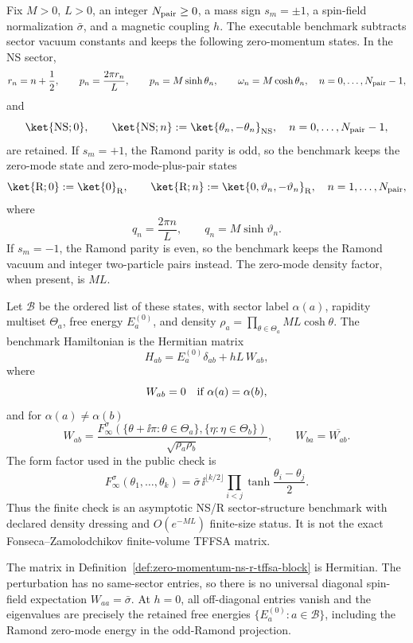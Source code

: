 \begin{definition}
\label{def:zero-momentum-ns-r-tffsa-block}
Fix \(M>0\), \(L>0\), an integer \(N_{\rm pair}\geq0\), a mass sign
\(s_m=\pm1\), a spin-field normalization \(\bar\sigma\), and a magnetic
coupling \(h\).  The executable benchmark subtracts sector vacuum constants
and keeps the following zero-momentum states.  In the NS sector,
\[
  r_n=n+\frac12,\qquad
  p_n=\frac{2\pi r_n}{L},\qquad
  p_n=M\sinh\theta_n,\qquad
  \omega_n=M\cosh\theta_n ,
  \quad n=0,\ldots,N_{\rm pair}-1,
\]
and
\[
  \ket{\mathrm{NS};0},\qquad
  \ket{\mathrm{NS};n}:=\ket{\theta_n,-\theta_n}_{\mathrm{NS}},\quad
  n=0,\ldots,N_{\rm pair}-1,
\]
are retained.  If \(s_m=+1\), the Ramond parity is odd, so the benchmark keeps
the zero-mode state and zero-mode-plus-pair states
\[
  \ket{\mathrm R;0}:=\ket{0}_{\mathrm R},\qquad
  \ket{\mathrm R;n}:=\ket{0,\vartheta_n,-\vartheta_n}_{\mathrm R},
  \quad n=1,\ldots,N_{\rm pair},
\]
where
\[
  q_n=\frac{2\pi n}{L},\qquad q_n=M\sinh\vartheta_n .
\]
If \(s_m=-1\), the Ramond parity is even, so the benchmark keeps the Ramond
vacuum and integer two-particle pairs instead.  The zero-mode density factor,
when present, is \(ML\).

Let \(\mathcal B\) be the ordered list of these states, with sector label
\(\alpha(a)\), rapidity multiset \(\Theta_a\), free energy \(E_a^{(0)}\),
and density \(\rho_a=\prod_{\theta\in\Theta_a}ML\cosh\theta\).  The benchmark
Hamiltonian is the Hermitian matrix
\[
  H_{ab}=E_a^{(0)}\delta_{ab}+hL\,W_{ab},
\]
where
\[
  W_{ab}=0\quad\hbox{if }\alpha(a)=\alpha(b),
\]
and for \(\alpha(a)\ne\alpha(b)\)
\begin{equation}
  W_{ab}
  =
  \frac{
    F_\infty^\sigma(
      \{\theta+\ii\pi:\theta\in\Theta_a\},
      \{\eta:\eta\in\Theta_b\})
  }{
    \sqrt{\rho_a\rho_b}
  },
  \qquad
  W_{ba}=\overline{W_{ab}} .
  \label{eq:zero-momentum-ns-r-tffsa-block}
\end{equation}
The form factor used in the public check is
\[
  F_\infty^\sigma(\theta_1,\ldots,\theta_k)
  =
  \bar\sigma\,\ii^{\lfloor k/2\rfloor}
  \prod_{i<j}\tanh\frac{\theta_i-\theta_j}{2}.
\]
Thus the finite check is an asymptotic NS/R sector-structure benchmark with
declared density dressing and \(O(e^{-ML})\) finite-size status.  It is not the
exact Fonseca--Zamolodchikov finite-volume TFFSA matrix.
\end{definition}

\begin{remark}
\label{rem:zero-momentum-ns-r-tffsa-hermitian}
The matrix in Definition~\ref{def:zero-momentum-ns-r-tffsa-block} is Hermitian.
The perturbation has no same-sector entries, so there is no universal diagonal
spin-field expectation \(W_{aa}=\bar\sigma\).  At \(h=0\), all off-diagonal
entries vanish and the eigenvalues are precisely the retained free energies
\(\{E_a^{(0)}:a\in\mathcal B\}\), including the Ramond zero-mode energy in the
odd-Ramond projection.
\end{remark}

